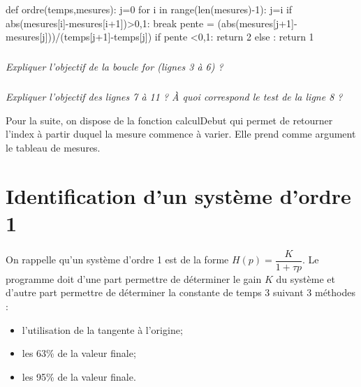 \documentclass[10pt]{article}
\newif\ifprof
\begin{document}
\begin{py}
\begin{minipage}[c]{.05\linewidth}
\end{minipage}\hfill
\begin{minipage}[c]{.95\linewidth}
\begin{python}
def ordre(temps,mesures):
    j=0
    for i in range(len(mesures)-1):
        j=i
        if abs(mesures[i]-mesures[i+1])>0,1:
            break
    pente = (abs(mesures[j+1]-mesures[j]))/(temps[j+1]-temps[j])
    if pente <0,1:
        return 2
    else : 
        return 1
\end{python}
\end{minipage}
\end{py} 

\subparagraph{}
\textit{Expliquer l'objectif de la boucle \textsl{for} (lignes 3 à 6) ?}
\ifprof
\begin{corrige}
Le but des lignes 3 à 6 est de détecter le début de la mesure. Puis conserver l'indice de début de la mesure (stocké dans $i$)
\end{corrige}
\else
\fi

\subparagraph{}
\textit{Expliquer l'objectif des lignes 7 à 11 ? \`A quoi correspond le test de la ligne 8 ?}
\ifprof

\begin{corrige}
Ces lignes permettent de retourner l'ordre (estimé) du système.
Pour cela on définit un seuil de pente (arbitraire) à l'origine au delà duquel on à affaire à un premier ordre (et en deçà duquel on considère que l'ordre est 2).
\end{corrige}

\else
\fi

\ifprof
\else
Pour la suite, on dispose de la fonction \textsf{calculDebut} qui permet de retourner l'index à partir duquel la mesure commence à varier. Elle prend comme argument le tableau de mesures.
\fi

\section{Identification d'un système d'ordre 1}

\ifprof
\else
On rappelle qu'un système d'ordre 1 est de la forme $H(p)=\dfrac{K}{1 + \tau p}$. Le programme doit d'une part permettre de déterminer le gain $K$ du système et d'autre part permettre de déterminer la constante de temps 3 suivant 3 méthodes : 
\begin{itemize}
\item l'utilisation de la tangente à l'origine;
\item les 63\% de la valeur finale;
\item les 95\% de la valeur finale. 
\end{itemize}
\end{document}
